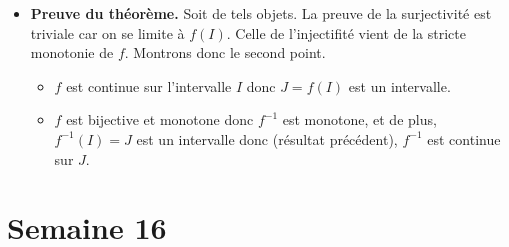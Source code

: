 \documentclass{article}
\renewenvironment{question_kholle}[2][ ]
{
	\subsection{\texorpdfstring{#2}{}}
	\notblank{#1}
	{
		\noindent #1
		\bigbreak
	}
	{}
	\begin{proof}
}
{
	\end{proof}
}
\begin{document}
\begin{question_kholle}
\begin{itemize}[label=$\vartriangleright$]
\begin{itemize}[label=$\star$]
\begin{itemize}
				            \item si $x\in I$ vérifie $x\geq x_{0}$, alors $f(x)\geq f(x_{0})>y_{0}$
			            \end{itemize}
			            par conséquent, $y_{0}\notin f(I)$.\\
			            Ainsi, $\ell_{g}=f(x_{0})$ et on montre de même que $f(x_{0})=\ell_{d}$ si bien que nous pouvons conclure que $f$ est continue en $x_{0}$.\\
			      \item Supposons à présent que $x_{0}$ est un bord de $I$. Il suffit d’adapter la preuve ci-dessus en ne considérant que l’intervalle contenant $I$ à choisir entre $[x_{0},+\infty[$ et $]-\infty,x_{0}]$.
		      \end{itemize}

		\item \textbf{Preuve du théorème.} Soit de tels objets. La preuve de la surjectivité est triviale car on se limite à $f(I)$. Celle de l’injectifité vient de la stricte monotonie de $f$. Montrons donc le second point.
		      \begin{itemize}
			      \item $f$ est continue sur l’intervalle $I$ donc $J=f(I)$ est un intervalle.
			      \item $f$ est bijective et monotone donc $f^{-1}$ est monotone, et de plus, $f^{-1}(I)=J$ est un intervalle donc (résultat précédent), $f^{-1}$ est continue sur $J$.
		      \end{itemize}
	\end{itemize}
\end{question_kholle}
\pagebreak\section{Semaine 16}
\end{document}
